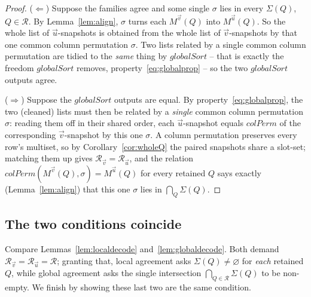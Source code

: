 \documentclass{article}
\begin{document}
\begin{proof}
($\Leftarrow$) Suppose the families agree and some single $\sigma$ lies in every
$\Sigma(Q)$, $Q\in\mathcal R$.  By Lemma~\ref{lem:align}, $\sigma$ turns each
$M^{\vec v}(Q)$ into $M^{\vec u}(Q)$.  So the whole list of $\vec u$-snapshots is
obtained from the whole list of $\vec v$-snapshots by that one common column
permutation $\sigma$.  Two lists related by a single common column permutation are
tidied to the \emph{same} thing by $globalSort$ -- that is exactly the freedom
$globalSort$ removes, property~\eqref{eq:globalprop} -- so the two $globalSort$
outputs agree.

($\Rightarrow$) Suppose the $globalSort$ outputs are equal.  By
property~\eqref{eq:globalprop}, the two (cleaned) lists must then be related by a
\emph{single} common column permutation $\sigma$: reading them off in their shared
order, each $\vec u$-snapshot equals $colPerm$ of the corresponding
$\vec v$-snapshot by this one $\sigma$.  A column permutation preserves every row's
multiset, so by
Corollary~\ref{cor:wholeQ} the paired snapshots share a slot-set; matching them up
gives $\mathcal R_{\vec v}=\mathcal R_{\vec u}$, and the relation
$colPerm(M^{\vec v}(Q),\sigma)=M^{\vec u}(Q)$ for every retained $Q$ says exactly
(Lemma~\ref{lem:align}) that this one $\sigma$ lies in $\bigcap_Q\Sigma(Q)$.
\end{proof}

\subsection*{The two conditions coincide}

Compare Lemmas~\ref{lem:localdecode} and~\ref{lem:globaldecode}.  Both demand
$\mathcal R_{\vec v}=\mathcal R_{\vec u}=\mathcal R$; granting that, local agreement
asks $\Sigma(Q)\neq\varnothing$ for \emph{each} retained $Q$, while global agreement
asks the single intersection $\bigcap_{Q\in\mathcal R}\Sigma(Q)$ to be non-empty.
We finish by showing these last two are the same condition.
\end{document}
